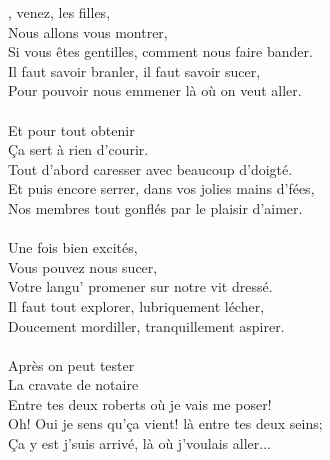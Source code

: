 
, venez, les filles,
\\Nous allons vous montrer,
\\Si vous êtes gentilles, comment nous faire bander.
\\Il faut savoir branler, il faut savoir sucer,
\\Pour pouvoir nous emmener là où on veut aller.
\\\\Et pour tout obtenir
\\Ça sert à rien d'courir.
\\Tout d'abord caresser avec beaucoup d'doigté.
\\Et puis encore serrer, dans vos jolies mains d'fées,
\\Nos membres tout gonflés par le plaisir d'aimer.
\\\\Une fois bien excités,
\\Vous pouvez nous sucer,
\\Votre langu' promener sur notre vit dressé.
\\Il faut tout explorer, lubriquement lécher,
\\Doucement mordiller, tranquillement aspirer.
\\\\Après on peut tester
\\La cravate de notaire
\\Entre tes deux roberts où je vais me poser!
\\Oh! Oui je sens qu'ça vient! là entre tes deux seins;
\\Ça y est j'suis arrivé, là où j'voulais aller...

\breakpage